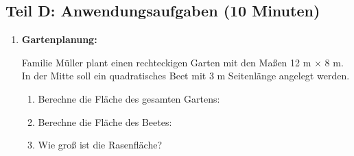 \subsection*{Teil D: Anwendungsaufgaben (10 Minuten)}

\begin{enumerate}[label=\arabic*.,resume]

    \item \textbf{Gartenplanung:}

    Familie Müller plant einen rechteckigen Garten mit den Maßen 12 m $\times$ 8 m. In der Mitte soll ein quadratisches Beet mit 3 m Seitenlänge angelegt werden.

    \begin{enumerate}[label=\alph*)]
        \item Berechne die Fläche des gesamten Gartens:

        \vspace{1.5cm}

        \item Berechne die Fläche des Beetes:

        \vspace{1.5cm}

        \item Wie groß ist die Rasenfläche?

        \vspace{1.5cm}

    \end{enumerate}

    \end{enumerate}